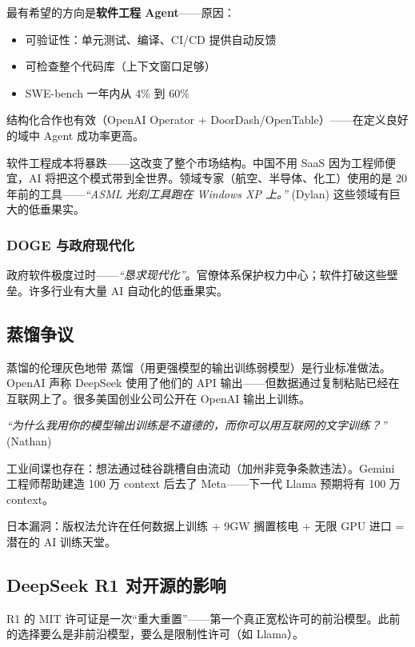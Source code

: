\documentclass[a4paper]{article}
\begin{document}
最有希望的方向是\textbf{软件工程 Agent}——原因：
\begin{itemize}
    \item 可验证性：单元测试、编译、CI/CD 提供自动反馈
    \item 可检查整个代码库（上下文窗口足够）
    \item SWE-bench 一年内从 4\% 到 60\%
\end{itemize}

结构化合作也有效（OpenAI Operator + DoorDash/OpenTable）——在定义良好的域中 Agent 成功率更高。

软件工程成本将暴跌——这改变了整个市场结构。中国不用 SaaS 因为工程师便宜，AI 将把这个模式带到全世界。领域专家（航空、半导体、化工）使用的是 20 年前的工具——\textit{``ASML 光刻工具跑在 Windows XP 上。''} (Dylan) 这些领域有巨大的低垂果实。

\subsubsection{DOGE 与政府现代化}

政府软件极度过时——\textit{``恳求现代化''}。官僚体系保护权力中心；软件打破这些壁垒。许多行业有大量 AI 自动化的低垂果实。

\subsection{蒸馏争议}

\begin{knowledgebox}{蒸馏的伦理灰色地带}
蒸馏（用更强模型的输出训练弱模型）是行业标准做法。OpenAI 声称 DeepSeek 使用了他们的 API 输出——但数据通过复制粘贴已经在互联网上了。很多美国创业公司公开在 OpenAI 输出上训练。

\textit{``为什么我用你的模型输出训练是不道德的，而你可以用互联网的文字训练？''} (Nathan)

工业间谍也存在：想法通过硅谷跳槽自由流动（加州非竞争条款违法）。Gemini 工程师帮助建造 100 万 context 后去了 Meta——下一代 Llama 预期将有 100 万 context。

日本漏洞：版权法允许在任何数据上训练 + 9GW 搁置核电 + 无限 GPU 进口 = 潜在的 AI 训练天堂。
\end{knowledgebox}

\subsection{DeepSeek R1 对开源的影响}

R1 的 MIT 许可证是一次``重大重置''——第一个真正宽松许可的前沿模型。此前的选择要么是非前沿模型，要么是限制性许可（如 Llama）。
\end{document}
